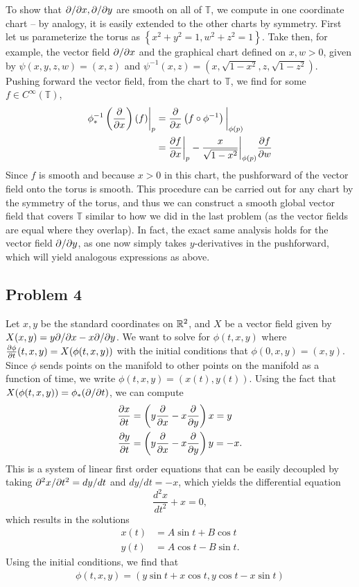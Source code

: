 \documentclass{../../mathnotes}
\begin{document}
To show that $\partial/\partial x,\partial/\partial y$ are smooth on all of $\mathbb{T}$, we compute in one coordinate chart -- by analogy,
it is easily extended to the other charts by symmetry. First let us parameterize the torus as $\left\{ x^2+y^2=1,w^2+z^2=1 \right\}$.
Take then, for example, the vector field $\partial/\partial x$ and the graphical chart defined on $x,w>0$, given by
$\psi(x,y,z,w)=(x,z)$ and $\psi^{-1}(x,z)=(x,\sqrt{1-x^2},z,\sqrt{1-z^2})$.
Pushing forward the vector field, from the chart to $\mathbb{T}$, we find for some $f\in C^\infty(\mathbb{T})$,
\begin{align*}
    \phi^{-1}_*\left( \frac{\partial}{\partial x} \right)(f)\bigg|_p&=\frac{\partial}{\partial x}\left( f\circ\phi^{-1} \right)\bigg|_{\phi(p)}\\
    &=\frac{\partial f}{\partial x}\bigg|_p-\frac{x}{\sqrt{1-x^2}}\bigg|_{\phi(p)}\frac{\partial f}{\partial w}
\end{align*}
Since $f$ is smooth and because $x>0$ in this chart, the pushforward of the vector field onto the torus is smooth.
This procedure can be carried out for any chart by the symmetry of the torus, and thus we can construct a smooth global vector field that covers
$\mathbb{T}$ similar to how we did in the last problem (as the vector fields are equal where they overlap).
In fact, the exact same analysis holds for the vector field $\partial/\partial y$, as one now simply takes $y$-derivatives in the pushforward,
which will yield analogous expressions as above.

\subsection*{Problem 4}

Let $x,y$ be the standard coordinates on $\mathbb{R}^2$, and $X$ be a vector field given by $X(x,y)=y\partial/\partial x-x\partial/\partial y$.
We want to solve for $\phi(t,x,y)$ where $\frac{\partial\phi}{\partial t}(t,x,y)=X(\phi(t,x,y))$ with the initial
conditions that $\phi(0,x,y)=(x,y)$. Since $\phi$ sends points on the manifold to other points on the manifold
as a function of time, we write $\phi(t,x,y)=(x(t),y(t))$. Using the fact that $X(\phi(t,x,y))=\phi_*(\partial/\partial t)$,
we can compute
\begin{align*}
    \frac{\partial x}{\partial t}&=\left( y\frac{\partial}{\partial x}-x\frac{\partial}{\partial y} \right)x=y\\
    \frac{\partial y}{\partial t}&=\left( y\frac{\partial}{\partial x}-x\frac{\partial}{\partial y} \right)y=-x.
\end{align*}
This is a system of linear first order equations that can be easily decoupled by taking
$\partial^2x/\partial t^2=dy/dt$ and $dy/dt=-x$, which yields the differential equation
\[\frac{d^2x}{dt^2}+x=0,\]
which results in the solutions
\begin{align*}
    x(t)&=A\sin t+B\cos t\\
    y(t)&=A\cos t-B\sin t.
\end{align*}
Using the initial conditions, we find that
\begin{align*}
    \phi(t,x,y)=\left( y\sin t+x\cos t,y\cos t-x\sin t \right)
\end{align*}
\end{document}
